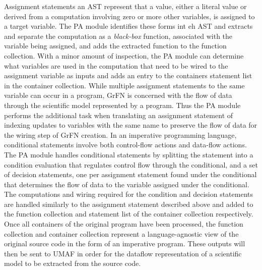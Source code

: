Assignment statements an AST represent that a value, either a literal value or derived from a computation involving zero or more other variables, is assigned to a target variable.
The PA module identifies these forms int eh AST and extracts and separate the computation as a \textit{black-box} function, associated with the variable being assigned, and adds the extracted function to the function collection.
With a minor amount of inspection, the PA module can determine what variables are used in the computation that need to be wired to the assignment variable as inputs and adds an entry to the containers statement list in the container collection.
While multiple assignment statements to the same variable can occur in a program, GrFN is concerned with the flow of data through the scientific model represented by a program.
Thus the PA module performs the additional task when translating an assignment statement of indexing updates to variables with the same name to preserve the flow of data for the wiring step of GrFN creation.
In an imperative programming language, conditional statements involve both control-flow actions and data-flow actions.
The PA module handles conditional statements by splitting the statement into a condition evaluation that regulates control flow through the conditional, and a set of decision statements, one per assignment statement found under the conditional that determines the flow of data to the variable assigned under the conditional.
The computations and wiring required for the condition and decision statements are handled similarly to the assignment statement described above and added to the function collection and statement list of the container collection respectively.
Once all containers of the original program have been processed, the function collection and container collection represent a language-agnostic view of the original source code in the form of an imperative program.
These outputs will then be sent to UMAF in order for the dataflow representation of a scientific model to be extracted from the source code.

